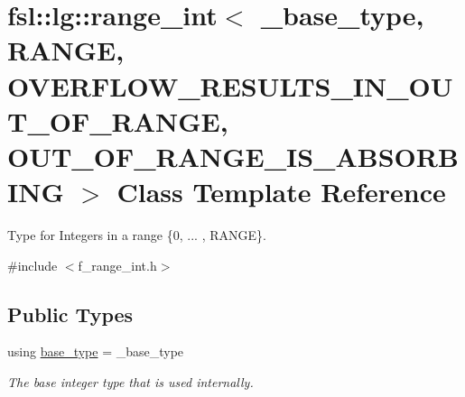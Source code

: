 \hypertarget{classfsl_1_1lg_1_1range__int}{}\section{fsl\+::lg\+::range\+\_\+int$<$ \+\_\+base\+\_\+type, R\+A\+N\+GE, O\+V\+E\+R\+F\+L\+O\+W\+\_\+\+R\+E\+S\+U\+L\+T\+S\+\_\+\+I\+N\+\_\+\+O\+U\+T\+\_\+\+O\+F\+\_\+\+R\+A\+N\+GE, O\+U\+T\+\_\+\+O\+F\+\_\+\+R\+A\+N\+G\+E\+\_\+\+I\+S\+\_\+\+A\+B\+S\+O\+R\+B\+I\+NG $>$ Class Template Reference}
\label{classfsl_1_1lg_1_1range__int}


Type for Integers in a range \{0, ... , R\+A\+N\+GE\}.  




{\ttfamily \#include $<$f\+\_\+range\+\_\+int.\+h$>$}

\subsection*{Public Types}
\begin{DoxyCompactItemize}
\item 
\mbox{\label{classfsl_1_1lg_1_1range__int_a901feb77897b3353d554f06d4d6a8f4a}} 
using \mbox{\hyperlink{classfsl_1_1lg_1_1range__int_a901feb77897b3353d554f06d4d6a8f4a}{base\+\_\+type}} = \+\_\+base\+\_\+type
\begin{DoxyCompactList}\small\item\em The base integer type that is used internally. \end{DoxyCompactList}\end{DoxyCompactItemize}

